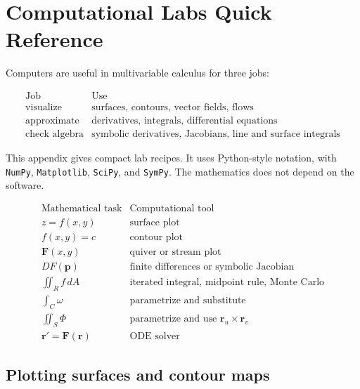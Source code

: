 
\chapter{Computational Labs Quick Reference}
\label{app:computational-labs}

Computers are useful in multivariable calculus for three jobs:

\[
\begin{array}{c|c}
\text{Job} & \text{Use} \\ \hline
\text{visualize} & \text{surfaces, contours, vector fields, flows}\\[1mm]
\text{approximate} & \text{derivatives, integrals, differential equations}\\[1mm]
\text{check algebra} & \text{symbolic derivatives, Jacobians, line and surface integrals}
\end{array}
\]

This appendix gives compact lab recipes.  It uses Python-style notation, with
\texttt{NumPy}, \texttt{Matplotlib}, \texttt{SciPy}, and \texttt{SymPy}.  The mathematics
does not depend on the software.

\[
\begin{array}{c|c}
\text{Mathematical task} & \text{Computational tool} \\ \hline
z=f(x,y) & \text{surface plot}\\[1mm]
f(x,y)=c & \text{contour plot}\\[1mm]
\mathbf F(x,y) & \text{quiver or stream plot}\\[1mm]
DF(\mathbf p) & \text{finite differences or symbolic Jacobian}\\[1mm]
\iint_R f\,dA & \text{iterated integral, midpoint rule, Monte Carlo}\\[1mm]
\int_C \omega & \text{parametrize and substitute}\\[1mm]
\iint_S \Phi & \text{parametrize and use }\mathbf r_u\times\mathbf r_v\\[1mm]
\mathbf r'=\mathbf F(\mathbf r) & \text{ODE solver}
\end{array}
\]

\section{Plotting surfaces and contour maps}
\label{app:G.1}

